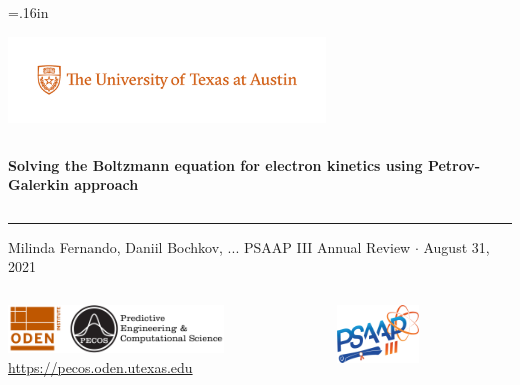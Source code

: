 \documentclass[mathserif, aspectratio=169]{beamer}
\begin{document}


\hoffset=.16in

\begin{frame}[plain,t]{}
\makeatletter
\includegraphics[height=0.9in,trim=50 40 40 0, clip]{PMSc_159_university_formal_horizontal.pdf} \newline
\begin{columns}[T,onlytextwidth]
{\bf \color{burntorange} \selectfont 
Solving the Boltzmann equation for electron kinetics using Petrov-Galerkin approach
}
\end{columns}
\vspace*{.15cm}
\rule{.8\textwidth}{0.6pt} \newline

\vspace*{0.05cm}
{\selectfont
  { \scriptsize
    Milinda Fernando, Daniil Bochkov, ...\newline
  }
  {\color{burntorange} \tiny
    PSAAP III Annual Review $\cdot$ August 31, 2021
  }
}

\vspace*{1cm}
\begin{columns}
\begin{column}{0.8\linewidth}
\includegraphics[height=0.5in]{oden_pecos_2020_wordmark.png}\\
{\scriptsize \url{https://pecos.oden.utexas.edu}}
\end{column}

\begin{column}{0.2\linewidth}
\includegraphics[height=0.6in]{psaap3-logo.png}
\end{column}
\end{columns}

\end{frame}
\hoffset=0in
\end{document}
